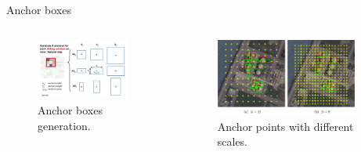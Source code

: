 \documentclass{beamer}
\begin{document}
\begin{frame}{Anchor boxes}
	\begin{columns}
		\begin{column}{0.5\textwidth}
			\begin{figure}
				\centering
				\includegraphics[width=0.9\textwidth]{images/anchor_boxes.png}
				\caption{Anchor boxes generation.}
			\end{figure}
		\end{column}
		\begin{column}{0.5\textwidth}
			\begin{figure}
			\centering
			\includegraphics[width=0.9\textwidth]{images/anchor_boxes_images.jpeg}
			\caption{Anchor points with different scales.}
		\end{figure}
		\end{column}
	\end{columns}
\end{frame}
\end{document}
